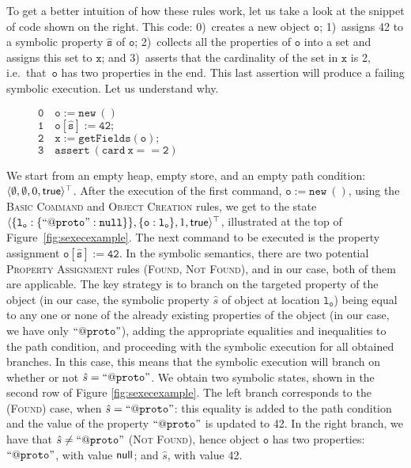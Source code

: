  To get a better intuition of how these rules work, let us take a look at the snippet of code shown on the right. 
This code: 
	0)~creates a new object $\mathtt{o}$;
	1)~assigns 42 to a symbolic property $\mathtt{\hat{s}}$ of $\mathtt{o}$; 
	2)~collects all the properties of $\mathtt{o}$ into a set and assigns this set to $\mathtt{x}$; and
	3)~asserts that the cardinality of the set in $\mathtt{x}$ is 2, i.e.~that~$\mathtt{o}$ has two properties in the end. This last assertion will produce a failing symbolic execution. Let us understand why.
%
\begin{wrapfigure}{R}{0.4\textwidth}
\vspace*{-0.25cm}
{\small
\hspace*{0.25cm} $\mathtt{0\quad o := new\ ()}$ \\
\hspace*{0.25cm} $\mathtt{1\quad o[\hat{s}] := 42};$ \\
\hspace*{0.25cm} $\mathtt{2\quad x := getFields(o);}$ \\
\hspace*{0.25cm} $\mathtt{3\quad assert\ (card \ x == 2)}$
}
\vspace*{-0.3cm}
\end{wrapfigure}
%
We start from an empty heap, empty store, and an empty path condition: $\langle \emptyset, \emptyset, 0, {\sf true} \rangle^\top$. After the execution of the first command, $\mathtt{o := new\ ()}$, using the \textsc{Basic Command} and \textsc{Object Creation} rules, we get to the state {\small $\langle \{ \mathtt{l_o : \{ ``@proto" : null} \} \}, \{ \mathtt{o : l_o} \} , 1, {\sf true} \rangle^\top$}, illustrated at the top of Figure~\ref{fig:sexecexample}.
The next command to be executed is the property assignment $\mathtt{o[\hat{s}] := 42}$. In the symbolic semantics, there are two potential \textsc{Property Assignment} rules (\textsc{Found}, \textsc{Not Found}), and in our case, both of them are applicable. The key strategy is to branch on the targeted property of the object (in our case, the symbolic property $\hat{s}$ of object at location $\mathtt{l_o}$) being equal to any one or none of the already existing properties of the object (in our case, we have only $\mathtt{``@proto"}$), adding the appropriate equalities and inequalities to the path condition, and proceeding with the symbolic execution for all obtained branches. In this case, this means that the symbolic execution will branch on whether or not $\hat{s} = \mathtt{``@proto"}$. We obtain two symbolic states, shown in the second row of Figure \ref{fig:sexecexample}. The left branch corresponds to the (\textsc{Found}) case, when $\hat{s} = \mathtt{``@proto"}$: this equality is added to the path condition and the value of the property $\mathtt{``@proto"}$ is updated to 42. In the right branch, we have that $\hat{s} \neq \mathtt{``@proto"}$ (\textsc{Not Found}), hence object $\mathtt{o}$ has two properties: $ \mathtt{``@proto"}$, with value ${\sf null}$; and $\hat{s}$, with value 42.
